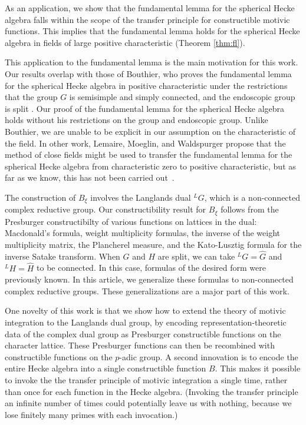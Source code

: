 As an application, we show that the fundamental lemma for the spherical Hecke algebra falls within
the scope of the transfer principle for constructible motivic functions.
This implies that the fundamental lemma holds for the spherical Hecke algebra in fields of large positive
characteristic (Theorem \ref{thm:fl}).

This application to the fundamental lemma is the main motivation for this work.  Our results overlap with
those of Bouthier, who proves the fundamental lemma for the spherical Hecke algebra in positive
characteristic under the restrictions that the group $G$ is semisimple and simply connected, 
and the endoscopic group is split \cite[Theorem~0.2]{bouthier}.  Our proof of the fundamental lemma for the
spherical Hecke algebra holds without his restrictions on the group and endoscopic group.
Unlike Bouthier, we are unable to be explicit in our assumption
on the characteristic of the field.  In other work,
Lemaire, Moeglin, and Waldspurger propose that the method of close fields might be used to transfer the
fundamental lemma for the spherical Hecke algebra from characteristic zero to positive characteristic, but as far as we know, 
this has not been
carried out~\cite[\S1.3]{LMW}.

The construction of $B_\xi$ involves the Langlands dual ${}^LG$, which is a non-connected complex reductive group.
Our constructibility result for $B_\xi$ follows from the  Presburger constructibilty of various
functions on lattices in the dual:  Macdonald's formula, weight multiplicity formulas, the inverse of the weight multiplicity matrix,
the Plancherel measure,
and the Kato-Lusztig formula for the inverse Satake transform.  
When $G$ and $H$ are split, we can take ${}^LG = \hat G$ and ${}^LH=\hat H$ to be connected.  In this case,
formulas of the desired form were previously known.  In this article, we
generalize these formulas to non-connected complex reductive groups.
These generalizations are a major part of this work.

One novelty of this work is that we show how to extend the theory of motivic integration to the Langlands
dual group, by encoding representation-theoretic data of the complex dual group as Presburger constructible functions on the character lattice. These
Presburger functions can then be recombined with constructible functions on the $p$-adic group.  A second innovation is
to encode the entire Hecke algebra into a single constructible function $B$.  This makes it possible to invoke the the transfer
principle of motivic integration a single time, rather than once for each function in the Hecke algebra.  (Invoking the transfer principle
an infinite number of times could potentially leave us with nothing, because we lose finitely many primes with each invocation.)

